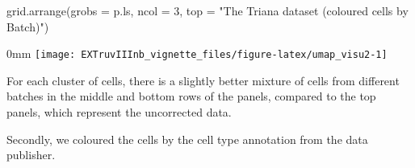 \documentclass[]{article}
\newcommand{\hlnum}[1]{\textcolor[rgb]{0.816,0.125,0.439}{#1}}%
\newcommand{\hlstr}[1]{\textcolor[rgb]{0.251,0.627,0.251}{#1}}%
\newcommand{\hlstd}[1]{\textcolor[rgb]{0.251,0.251,0.251}{#1}}%
\newenvironment{Shaded}{\begin{myshaded}}{\end{myshaded}}
\newcommand{\DecValTok}[1]{\hlnum{#1}}
\newcommand{\StringTok}[1]{\hlstr{#1}}
\newcommand{\FunctionTok}[1]{\hlstd{#1}}
\newcommand{\AttributeTok}[1]{{#1}}
\newcommand{\NormalTok}[1]{\hlstd{#1}}
\begin{document}
\begin{Shaded}
\begin{Highlighting}[]
\FunctionTok{grid.arrange}\NormalTok{(}\AttributeTok{grobs =}\NormalTok{ p.ls, }\AttributeTok{ncol =} \DecValTok{3}\NormalTok{, }\AttributeTok{top =} \StringTok{"The Triana dataset (coloured cells by Batch)"}\NormalTok{)}
\end{Highlighting}
\end{Shaded}

\begin{adjustwidth}{\fltoffset}{0mm}
\texttt{[image: EXTruvIIInb\_vignette\_files/figure-latex/umap\_visu2-1]} \end{adjustwidth}

For each cluster of cells, there is a slightly better mixture of cells from different batches in the middle and bottom rows of the panels, compared to the top panels, which represent the uncorrected data.

Secondly, we coloured the cells by the cell type annotation from the data publisher.
\end{document}

